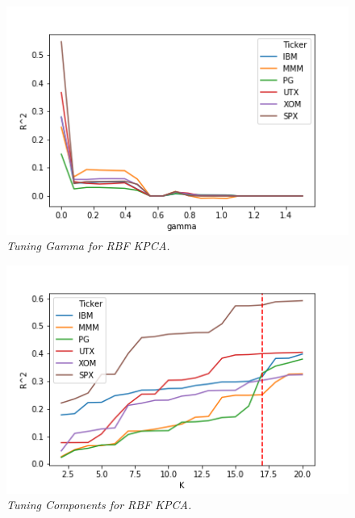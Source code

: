 \documentclass[a4paper]{article}
\begin{document}
   \begin{figure}[t]
   	\centering
   	\includegraphics[width=\linewidth]{rbf_gamma_tune.png}
   	\caption{{\it Tuning Gamma for RBF KPCA.}}
   	\label{fig:RBFGammaTuning}
   \end{figure}
   
   \begin{figure}[t]
   	\centering
   	\includegraphics[width=\linewidth]{KPCA_tune.png}
   	\caption{{\it Tuning Components for RBF KPCA.}}
   	\label{fig:RBFComponentTuning}
   \end{figure}
   
\end{document}
